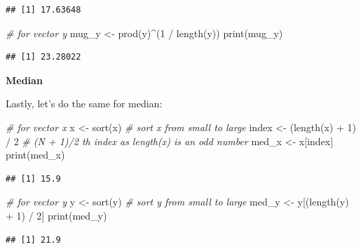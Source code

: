 \documentclass[
]{article}
\newenvironment{Shaded}{\begin{snugshade}}{\end{snugshade}}
\newcommand{\CommentTok}[1]{\textcolor[rgb]{0.56,0.35,0.01}{\textit{#1}}}
\newcommand{\DecValTok}[1]{\textcolor[rgb]{0.00,0.00,0.81}{#1}}
\newcommand{\FunctionTok}[1]{\textcolor[rgb]{0.00,0.00,0.00}{#1}}
\newcommand{\NormalTok}[1]{#1}
\newcommand{\OtherTok}[1]{\textcolor[rgb]{0.56,0.35,0.01}{#1}}
\newcommand{\SpecialCharTok}[1]{\textcolor[rgb]{0.00,0.00,0.00}{#1}}
\begin{document}
\begin{verbatim}
## [1] 17.63648
\end{verbatim}

\begin{Shaded}
\begin{Highlighting}[]
\CommentTok{\# for vector y}
\NormalTok{mug\_y }\OtherTok{\textless{}{-}} \FunctionTok{prod}\NormalTok{(y)}\SpecialCharTok{\^{}}\NormalTok{(}\DecValTok{1} \SpecialCharTok{/} \FunctionTok{length}\NormalTok{(y))}
\FunctionTok{print}\NormalTok{(mug\_y)}
\end{Highlighting}
\end{Shaded}

\begin{verbatim}
## [1] 23.28022
\end{verbatim}

\textbf{Median}

Lastly, let's do the same for median:

\begin{Shaded}
\begin{Highlighting}[]
\CommentTok{\# for vector x}
\NormalTok{x }\OtherTok{\textless{}{-}} \FunctionTok{sort}\NormalTok{(x) }\CommentTok{\# sort x from small to large}
\NormalTok{index }\OtherTok{\textless{}{-}}\NormalTok{ (}\FunctionTok{length}\NormalTok{(x) }\SpecialCharTok{+} \DecValTok{1}\NormalTok{) }\SpecialCharTok{/} \DecValTok{2} \CommentTok{\# (N + 1)/2 th index as length(x) is an odd number}
\NormalTok{med\_x }\OtherTok{\textless{}{-}}\NormalTok{ x[index]}
\FunctionTok{print}\NormalTok{(med\_x)}
\end{Highlighting}
\end{Shaded}

\begin{verbatim}
## [1] 15.9
\end{verbatim}

\begin{Shaded}
\begin{Highlighting}[]
\CommentTok{\# for vector y}
\NormalTok{y }\OtherTok{\textless{}{-}} \FunctionTok{sort}\NormalTok{(y) }\CommentTok{\# sort y from small to large}
\NormalTok{med\_y }\OtherTok{\textless{}{-}}\NormalTok{ y[(}\FunctionTok{length}\NormalTok{(y) }\SpecialCharTok{+} \DecValTok{1}\NormalTok{) }\SpecialCharTok{/} \DecValTok{2}\NormalTok{]}
\FunctionTok{print}\NormalTok{(med\_y)}
\end{Highlighting}
\end{Shaded}

\begin{verbatim}
## [1] 21.9
\end{verbatim}
\end{document}
